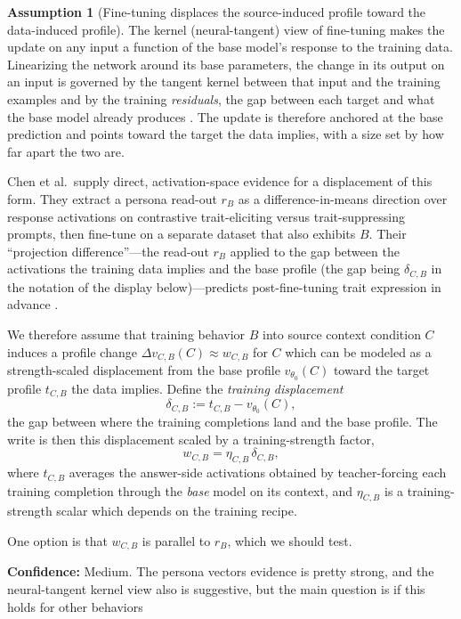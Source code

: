 \documentclass[11pt]{article}
\theoremstyle{definition}
\theoremstyle{definition}
\theoremstyle{assumptionstyle}
\newtheorem{assumption}{Assumption}[section]
\newcounter{prediction}
\begin{document}
\begin{assumption}[Fine-tuning displaces the source-induced profile toward the data-induced profile]
\label{a:source-write}
The kernel (neural-tangent) view of fine-tuning makes the update on any input a
function of the base model's response to the training data. Linearizing the network
around its base parameters, the change in its output on an input is governed by the
tangent kernel between that input and the training examples and by the training
\emph{residuals}, the gap between each target and what the base model already
produces \cite{jacot2018,malladi2023}. The update is therefore anchored at the base
prediction and points toward the target the data implies, with a size set by how far
apart the two are.

Chen et al.\ supply direct, activation-space evidence for a displacement of this form.
They extract a persona read-out \(r_B\) as a difference-in-means direction over
response activations on contrastive trait-eliciting versus trait-suppressing prompts,
then fine-tune on a separate dataset that also exhibits \(B\). Their ``projection difference''---the read-out $r_B$ applied to the gap between the
activations the training data implies and the base profile (the gap being
$\delta_{C,B}$ in the notation of the display below)---predicts post-fine-tuning trait
expression in advance \cite{chen2025}.

We therefore assume that training behavior $B$ into source context condition $C$
induces a profile change \(\Delta v_{C,B}(C)\approx w_{C,B}\) for $C$ which
can be modeled as a strength-scaled displacement from the base profile
$v_{\theta_0}(C)$ toward the target profile $t_{C,B}$ the data implies. Define
the \emph{training displacement}
\begin{equation}
\delta_{C,B}
:=
t_{C,B}-v_{\theta_0}(C),
\label{eq:displacement}
\end{equation}
the gap between where the training completions land and the base profile. The write
is then this displacement scaled by a training-strength factor,
\[
w_{C,B}
=
\eta_{C,B}\,\delta_{C,B},
\]
where \(t_{C,B}\) averages the answer-side activations obtained by teacher-forcing
each training completion through the \emph{base} model on its context, and
\(\eta_{C,B}\) is a training-strength scalar which depends on the training recipe.

One option is that $w_{C,B}$ is parallel to $r_B$, which we should test.

\textbf{Confidence:} Medium. The persona vectors evidence is pretty strong, and the neural-tangent kernel view also is suggestive, but the main question is if this holds for other behaviors


\end{assumption}
\end{document}
